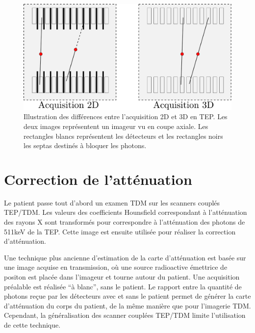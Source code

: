 
\begin{figure}
\centering
\includegraphics[width=12cm]{images/2D3D}
\caption[Acquisitions 2D et 3D en TEP]{Illustration des différences entre l'acquisition 2D et 3D en TEP. Les deux images représentent un imageur vu en coupe axiale. Les rectangles blancs représentent les détecteurs et les rectangles noirs les septas destinés à bloquer les photons. }
\label{fig:2D3D}
\end{figure}



	\section{Correction de l'atténuation}
\label{CorrectionAttenuation}

Le patient passe tout d'abord un examen TDM sur les scanners couplés TEP/TDM. Les valeurs des coefficients Hounsfield correspondant à l'atténuation des rayons X sont transformés pour correspondre à l'atténuation des photons de 511keV de la TEP. Cette image est ensuite utilisée pour réaliser la correction d'atténuation. 

Une technique plus ancienne d'estimation de la carte d'atténuation est basée sur une image acquise en transmission, où une source radioactive émettrice de positon est placée dans l'imageur et tourne autour du patient. Une acquisition  préalable est réalisée ``à blanc'', sans le patient. Le rapport entre la quantité de photons reçue par les détecteurs avec et sans le patient permet de générer la carte d'atténuation du corps du patient, de la même manière que pour l'imagerie TDM. Cependant, la généralisation des scanner couplées TEP/TDM limite l'utilisation de cette technique.

